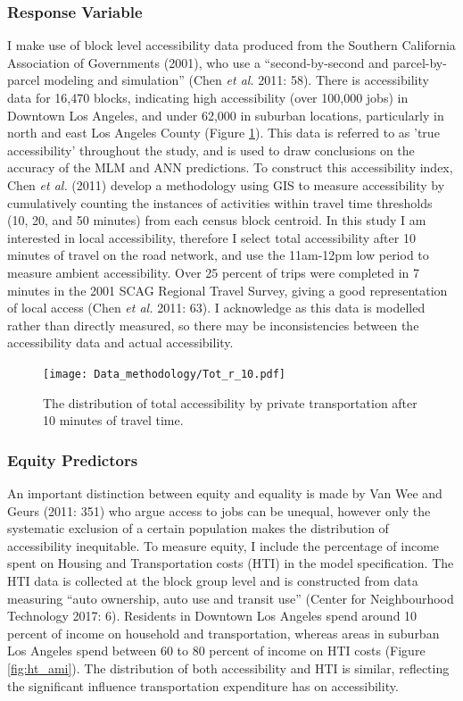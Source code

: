 \documentclass[a4paper,UKenglish]{lipics-v2018}
\begin{document}
\subsubsection{Response Variable}
I make use of block level accessibility data produced from the Southern California Association of Governments (2001), who use a “second-by-second and parcel-by-parcel modeling and simulation” (Chen \textit{et al.} 2011: 58). There is accessibility data for 16,470 blocks, indicating high accessibility (over 100,000 jobs) in Downtown Los Angeles, and under 62,000 in suburban locations, particularly in north and east Los Angeles County (Figure \ref{fig:Tot_r_10}). This data is referred to as 'true accessibility' throughout the study, and is used to draw conclusions on the accuracy of the MLM and ANN predictions. To construct this accessibility index, Chen \textit{et al.} (2011) develop a methodology using GIS to measure accessibility by cumulatively counting the instances of activities within travel time thresholds (10, 20, and 50 minutes) from each census block centroid. In this study I am interested in local accessibility, therefore I select total accessibility after 10 minutes of travel on the road network, and use the 11am-12pm low period to measure ambient accessibility. Over 25 percent of trips were completed in 7 minutes in the 2001 SCAG Regional Travel Survey, giving a good representation of local access (Chen \textit{et al.} 2011: 63). I acknowledge as this data is modelled rather than directly measured, so there may be inconsistencies between the accessibility data and actual accessibility.

\begin{figure}[ht]
    \centering
    \texttt{[image: Data\_methodology/Tot\_r\_10.pdf]}
    \caption[Total local Accessibility]{The distribution of total accessibility by private transportation after 10 minutes of travel time.} 
    \label{fig:Tot_r_10}
\end{figure}

\subsubsection{Equity Predictors}
An important distinction between equity and equality is made by Van Wee and Geurs (2011: 351) who argue access to jobs can be unequal, however only the systematic exclusion of a certain population makes the distribution of accessibility inequitable. To measure equity, I include the percentage of income spent on Housing and Transportation costs (HTI) in the model specification. The HTI data is collected at the block group level and is constructed from data measuring “auto ownership, auto use and transit use” (Center for Neighbourhood Technology 2017: 6). Residents in Downtown Los Angeles spend around 10 percent of income on household and transportation, whereas areas in suburban Los Angeles spend between 60 to 80 percent of income on HTI costs (Figure \ref{fig:ht_ami}). The distribution of both accessibility and HTI is similar, reflecting the significant influence transportation expenditure has on accessibility.
\end{document}
